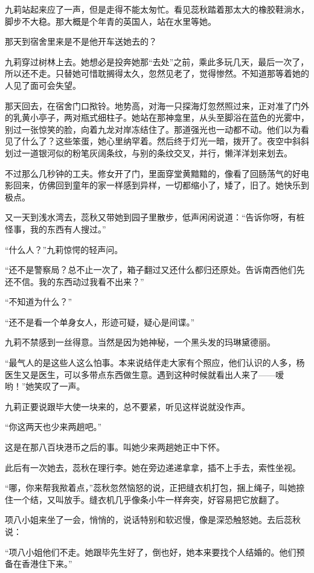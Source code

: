 \par 九莉站起来应了一声，但是走得不能太匆忙。看见蕊秋踏着那太大的橡胶鞋淌水，脚步不大稳。那大概是个年青的英国人，站在水里等她。
\par 那天到宿舍里来是不是他开车送她去的？
\par 九莉穿过树林上去。她想必是投奔她那“去处”之前，乘此多玩几天，最后一次了，所以还不走。只替她可惜耽搁得太久，忽然见老了，觉得惨然。不知道那等着她的人见了面可会失望。
\par 那天回去，在宿舍门口揿铃。地势高，对海一只探海灯忽然照过来，正对准了门外的乳黄小亭子，两对瓶式细柱子。她站在那神龛里，从头至脚浴在蓝色的光雾中，别过一张惊笑的脸，向着九龙对岸冻结住了。那道强光也一动都不动。他们以为看见了什么了？这些笨蛋，她心里纳罕着。然后终于灯光一暗，拨开了。夜空中斜斜划过一道银河似的粉笔灰阔条纹，与别的条纹交叉，并行，懒洋洋划来划去。
\par 不过那么几秒钟的工夫。修女开了门，里面穿堂黄黯黯的，像看了回肠荡气的好电影回来，仿佛回到童年的家一样感到异样，一切都缩小了，矮了，旧了。她快乐到极点。
\par 又一天到浅水湾去，蕊秋又带她到园子里散步，低声闲闲说道：“告诉你呀，有桩怪事，我的东西有人搜过。”
\par “什么人？”九莉惊愕的轻声问。
\par “还不是警察局？总不止一次了，箱子翻过又还什么都归还原处。告诉南西他们先还不信。我的东西动过我看不出来？”
\par “不知道为什么？”
\par “还不是看一个单身女人，形迹可疑，疑心是间谍。”
\par 九莉不禁感到一丝得意。当然是因为她神秘，一个黑头发的玛琳黛德丽。
\par “最气人的是这些人这么怕事。本来说结伴走大家有个照应，他们认识的人多，杨医生又是医生，可以多带点东西做生意。遇到这种时候就看出人来了——嗳哟！”她笑叹了一声。
\par 九莉正要说跟毕大使一块来的，总不要紧，听见这样说就没作声。
\par “你这两天也少来两趟吧。”
\par 这是在那八百块港币之后的事。叫她少来两趟她正中下怀。
\par 此后有一次她去，蕊秋在理行李。她在旁边递递拿拿，插不上手去，索性坐视。
\par “哪，你来帮我揿着点，”蕊秋忽然恼怒的说，正把缝衣机打包，捆上绳子，叫她捺住一个结，又叫放手。缝衣机几乎像条小牛一样奔突，好容易把它放翻了。
\par 项八小姐来坐了一会，悄悄的，说话特别和软迟慢，像是深恐触怒她。去后蕊秋说：
\par “项八小姐他们不走。她跟毕先生好了，倒也好，她本来要找个人结婚的。他们预备在香港住下来。”
